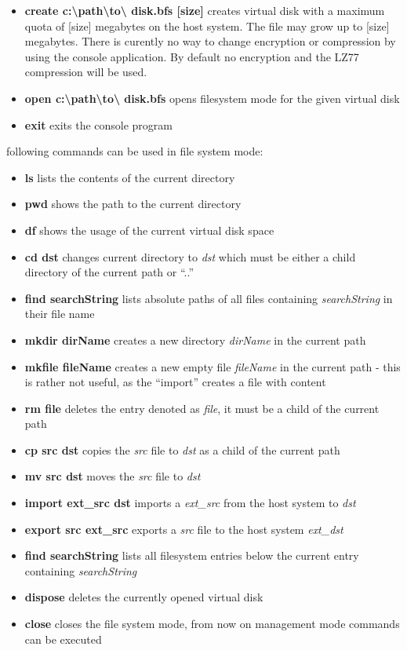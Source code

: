 \begin{itemize}
  \item{\textbf{create c:\textbackslash path\textbackslash to\textbackslash
  disk.bfs [size]}} creates virtual disk with a maximum quota of [size]
  megabytes on the host system. The file may grow up to [size] megabytes. There
  is curently no way to change encryption or compression by using the console
  application. By default no encryption and the LZ77 compression will be used.
  \item {\textbf{open c:\textbackslash path\textbackslash to\textbackslash
  disk.bfs}} opens filesystem mode for the given virtual disk
  \item {\textbf{exit}} exits the console program
\end{itemize}

following commands can be used in file system mode:

\begin{itemize}
  \item {\textbf{ls}} lists the contents of the current directory
  \item {\textbf{pwd}} shows the path to the current directory
  \item {\textbf{df}} shows the usage of the current virtual disk space
  \item {\textbf{cd dst}} changes current directory to \textit{dst} which must
  be either a child directory of the current path or ``..''
  \item {\textbf{find searchString}} lists absolute paths of all files
  containing \textit{searchString} in their file name
  \item {\textbf{mkdir dirName}} creates a new directory \textit{dirName} in the
  current path
  \item {\textbf{mkfile fileName}} creates a new empty file \textit{fileName} in
  the current path - this is rather not useful, as the ``import'' creates a
  file with content
  \item {\textbf{rm file}} deletes the entry denoted as \textit{file}, it must
  be a child of the current path
  \item {\textbf{cp src dst}} copies the \textit{src} file to \textit{dst} as a
  child of the current path
  \item {\textbf{mv src dst}} moves the \textit{src} file to \textit{dst}
  \item {\textbf{import ext\_src dst}} imports a \textit{ext\_src} from the
  host system to \textit{dst}
  \item {\textbf{export src ext\_src}} exports a \textit{src} file to the host
  system \textit{ext\_dst}
  \item {\textbf{find searchString}} lists all filesystem entries below the
  current entry containing \textit{searchString}
  \item {\textbf{dispose}} deletes the currently opened virtual disk
  \item {\textbf{close}} closes the file system mode, from now on management mode
  commands can be executed
\end{itemize}